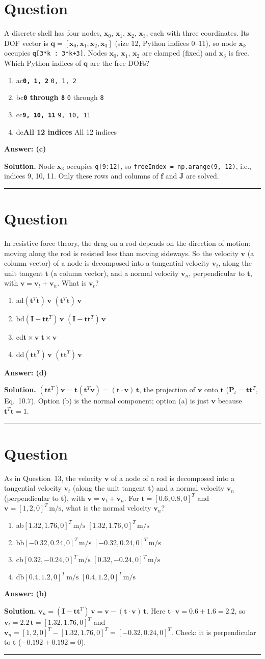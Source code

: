 \documentclass[letterpaper,11pt]{article}
\newcounter{qnum}
\newcommand{\opt}[3]{\item \if#1#2{\boldmath\textbf{#3}} \quad \textcolor{OliveGreen}{\checkmark}\else #3\fi}
\newcommand{\sol}[7]{%
  \stepcounter{qnum}%
  \section*{Question \theqnum}
  #1
  \begin{enumerate}[label=(\alph*)]
    \opt{a}{#6}{#2}
    \opt{b}{#6}{#3}
    \opt{c}{#6}{#4}
    \opt{d}{#6}{#5}
  \end{enumerate}
  \vspace{1mm}
  \textbf{Answer: (#6)}

  \textbf{Solution.} #7

  \vspace{2mm}\hrule
}
\begin{document}
%
%
\sol{A discrete shell has four nodes, $\mathbf{x}_0$, $\mathbf{x}_1$, $\mathbf{x}_2$, $\mathbf{x}_3$, each with three coordinates. Its DOF vector is $\mathbf{q} = [\mathbf{x}_0, \mathbf{x}_1, \mathbf{x}_2, \mathbf{x}_3]$ (size 12, Python indices 0--11), so node $\mathbf{x}_k$ occupies \texttt{q[3*k : 3*k+3]}. Nodes $\mathbf{x}_0$, $\mathbf{x}_1$, $\mathbf{x}_2$ are clamped (fixed) and $\mathbf{x}_3$ is free. Which Python indices of $\mathbf{q}$ are the free DOFs?}
  {\texttt{0, 1, 2}}
  {\texttt{0} through \texttt{8}}
  {\texttt{9, 10, 11}}
  {All 12 indices}
  {c}
  {Node $\mathbf{x}_3$ occupies \texttt{q[9:12]}, so \texttt{freeIndex = np.arange(9, 12)}, i.e., indices 9, 10, 11. Only these rows and columns of $\mathbf{f}$ and $\mathbf{J}$ are solved.}

%
%
\sol{In resistive force theory, the drag on a rod depends on the direction of motion: moving along the rod is resisted less than moving sideways. So the velocity $\mathbf{v}$ (a column vector) of a node is decomposed into a tangential velocity $\mathbf{v}_t$, along the unit tangent $\mathbf{t}$ (a column vector), and a normal velocity $\mathbf{v}_n$, perpendicular to $\mathbf{t}$, with $\mathbf{v} = \mathbf{v}_t + \mathbf{v}_n$. What is $\mathbf{v}_t$?}
  {$(\mathbf{t}^T \mathbf{t})\, \mathbf{v}$}
  {$(\mathbf{I} - \mathbf{t}\mathbf{t}^T)\, \mathbf{v}$}
  {$\mathbf{t} \times \mathbf{v}$}
  {$(\mathbf{t}\mathbf{t}^T)\, \mathbf{v}$}
  {d}
  {$(\mathbf{t}\mathbf{t}^T)\mathbf{v} = \mathbf{t}(\mathbf{t}^T\mathbf{v}) = (\mathbf{t} \cdot \mathbf{v})\,\mathbf{t}$, the projection of $\mathbf{v}$ onto $\mathbf{t}$ ($\mathbf{P}_t = \mathbf{t}\mathbf{t}^T$, Eq.~10.7). Option (b) is the normal component; option (a) is just $\mathbf{v}$ because $\mathbf{t}^T\mathbf{t} = 1$.}

%
%
\sol{As in Question~13, the velocity $\mathbf{v}$ of a node of a rod is decomposed into a tangential velocity $\mathbf{v}_t$ (along the unit tangent $\mathbf{t}$) and a normal velocity $\mathbf{v}_n$ (perpendicular to $\mathbf{t}$), with $\mathbf{v} = \mathbf{v}_t + \mathbf{v}_n$. For $\mathbf{t} = [0.6, 0.8, 0]^T$ and $\mathbf{v} = [1, 2, 0]^T\,\mathrm{m/s}$, what is the normal velocity $\mathbf{v}_n$?}
  {$[1.32, 1.76, 0]^T\,\mathrm{m/s}$}
  {$[-0.32, 0.24, 0]^T\,\mathrm{m/s}$}
  {$[0.32, -0.24, 0]^T\,\mathrm{m/s}$}
  {$[0.4, 1.2, 0]^T\,\mathrm{m/s}$}
  {b}
  {$\mathbf{v}_n = (\mathbf{I} - \mathbf{t}\mathbf{t}^T)\,\mathbf{v} = \mathbf{v} - (\mathbf{t} \cdot \mathbf{v})\,\mathbf{t}$. Here $\mathbf{t} \cdot \mathbf{v} = 0.6 + 1.6 = 2.2$, so $\mathbf{v}_t = 2.2\,\mathbf{t} = [1.32, 1.76, 0]^T$ and $\mathbf{v}_n = [1, 2, 0]^T - [1.32, 1.76, 0]^T = [-0.32, 0.24, 0]^T$. Check: it is perpendicular to $\mathbf{t}$ ($-0.192 + 0.192 = 0$).}
\end{document}
